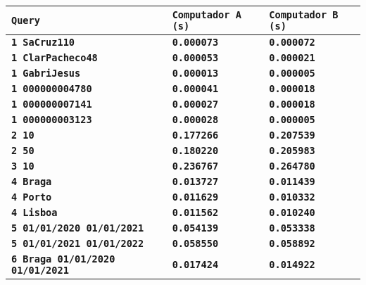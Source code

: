 \documentclass[12pt,a4paper]{report}
\begin{document}
{
\setlength\arrayrulewidth{1pt}
\begin{tabularx}{\textwidth} { 
  | >{\centering\arraybackslash}X
  | >{\centering\arraybackslash}X
  | >{\centering\arraybackslash}X | }
 \hline
 \texttt{\textbf{Query}} & \texttt{\textbf{Computador A (s)}} & \texttt{\textbf{Computador B (s)}}  \\
 \hline
 \texttt{\textbf{1 SaCruz110}} & \texttt{\textbf{0.000073}} & \texttt{\textbf{0.000072}}  \\
 \hline
 \texttt{\textbf{1 ClarPacheco48}} & \texttt{\textbf{0.000053}} & \texttt{\textbf{0.000021}} \\
 \hline
 \texttt{\textbf{1 GabriJesus}} & \texttt{\textbf{0.000013}} & \texttt{\textbf{0.000005}} \\
 \hline
 \texttt{\textbf{1 000000004780}} & \texttt{\textbf{0.000041}} & \texttt{\textbf{0.000018}} \\
 \hline
 \texttt{\textbf{1 000000007141}} & \texttt{\textbf{0.000027}} & \texttt{\textbf{0.000018}} \\
 \hline
 \texttt{\textbf{1 000000003123}} & \texttt{\textbf{0.000028}} & \texttt{\textbf{0.000005}} \\
 \hline
 \texttt{\textbf{2 10}} & \texttt{\textbf{0.177266}} & \texttt{\textbf{0.207539}} \\
 \hline
 \texttt{\textbf{2 50}} & \texttt{\textbf{0.180220}} & \texttt{\textbf{0.205983}} \\
 \hline
 \texttt{\textbf{3 10}} & \texttt{\textbf{0.236767}} & \texttt{\textbf{0.264780}} \\
 \hline
 \texttt{\textbf{4 Braga}} & \texttt{\textbf{0.013727}} & \texttt{\textbf{0.011439}} \\
 \hline
 \texttt{\textbf{4 Porto}} & \texttt{\textbf{0.011629}} & \texttt{\textbf{0.010332}} \\
 \hline
 \texttt{\textbf{4 Lisboa}} & \texttt{\textbf{0.011562}} & \texttt{\textbf{0.010240}} \\
 \hline
 \texttt{\textbf{5 01/01/2020 01/01/2021}} & \vspace{-5pt}\texttt{\textbf{0.054139}} & \vspace{-5pt}\texttt{\textbf{0.053338}} \\
 \hline
 \texttt{\textbf{5 01/01/2021 01/01/2022}} & \vspace{-5pt}\texttt{\textbf{0.058550}} & \vspace{-5pt}\texttt{\textbf{0.058892}} \\
 \hline
 \texttt{\textbf{6 Braga 01/01/2020 01/01/2021}} & \vspace{-5pt}\texttt{\textbf{0.017424}} & \vspace{-5pt}\texttt{\textbf{0.014922}} \\

\end{tabularx}}
\end{document}
